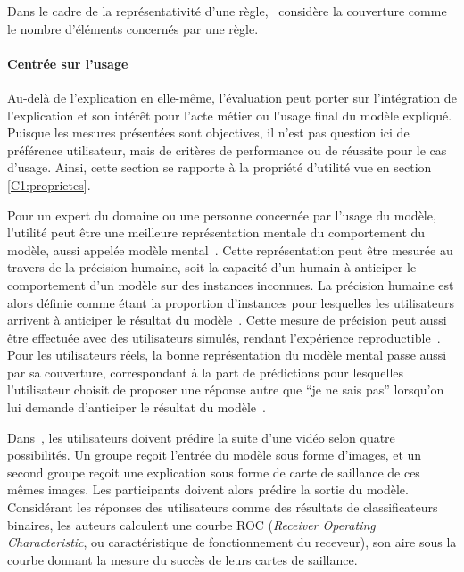 Dans le cadre de la représentativité d'une règle,~\cite{Lakkaraju2019} considère la couverture comme le nombre d'éléments concernés par une règle. %


\paragraph{Centrée sur l'usage}
Au-delà de l'explication en elle-même, l'évaluation peut porter sur l'intégration de l'explication et son intérêt pour l'acte métier ou l'usage final du modèle expliqué. Puisque les mesures présentées sont objectives, il n'est pas question ici de préférence utilisateur, mais de critères de performance ou de réussite pour le cas d'usage. Ainsi, cette section se rapporte à la propriété d'utilité vue en section \ref{C1:proprietes}.

Pour un expert du domaine ou une personne concernée par l'usage du modèle, l'utilité peut être une meilleure représentation mentale du comportement du modèle, aussi appelée modèle mental~\cite{Arrieta2020,Dam2018,Mohseni2021a}. Cette représentation peut être mesurée au travers de la précision humaine, soit la capacité d'un humain à anticiper le comportement d'un modèle sur des instances inconnues. La précision humaine est alors définie comme étant la proportion d'instances pour lesquelles les utilisateurs arrivent à anticiper le résultat du modèle~\cite{DoshiVelez2017}. Cette mesure de précision peut aussi être effectuée avec des utilisateurs simulés, rendant l'expérience reproductible~\cite{Ribeiro2018}.
Pour les utilisateurs réels, la bonne représentation du modèle mental passe aussi par sa couverture, correspondant à la part de prédictions pour lesquelles l'utilisateur choisit de proposer une réponse autre que ``je ne sais pas'' lorsqu'on lui demande d'anticiper le résultat du modèle~\cite{Ribeiro2018}.

Dans~\cite{Iyer2018}, les utilisateurs doivent prédire la suite d'une vidéo selon quatre possibilités. Un groupe reçoit l'entrée du modèle sous forme d'images, et un second groupe reçoit une explication sous forme de carte de saillance de ces mêmes images. Les participants doivent alors prédire la sortie du modèle. Considérant les réponses des utilisateurs comme des résultats de classificateurs binaires, les auteurs calculent une courbe ROC (\textit{Receiver Operating Characteristic}, ou caractéristique de fonctionnement du receveur), son aire sous la courbe donnant la mesure du succès de leurs cartes de saillance. %

